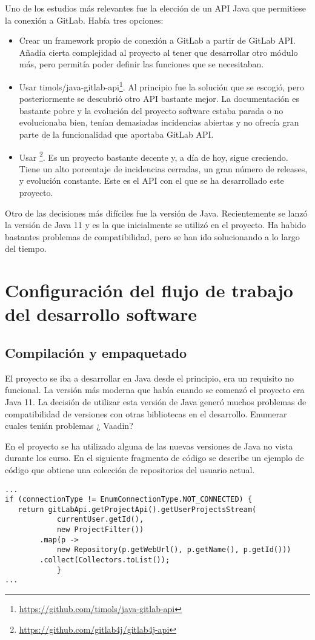 Uno de los estudios más relevantes fue la elección de un API Java que permitiese la conexión a GitLab. Había tres opciones:
\begin{itemize}
	\item Crear un framework propio de conexión a GitLab a partir de GitLab API. Añadía cierta complejidad al proyecto al tener que desarrollar otro módulo más, pero permitía poder definir las funciones que se necesitaban.
	\item Usar timols/java-gitlab-api\footnote{\url{https://github.com/timols/java-gitlab-api}}\cite{olshansky_wrapper_2019}. Al principio fue la solución que se escogió, pero posteriormente se descubrió otro API bastante mejor. La documentación es bastante pobre y la evolución del proyecto software estaba parada o no evolucionaba bien, tenían demasiadas incidencias abiertas y no ofrecía gran parte de la funcionalidad que aportaba GitLab API.
	\item  Usar \footnote{\url{https://github.com/gitlab4j/gitlab4j-api}}\cite{noauthor_gitlab4j_2019}. Es un proyecto bastante decente y, a día de hoy, sigue creciendo. Tiene un alto porcentaje de incidencias cerradas, un gran número de releases, y evolución constante. Este es el API con el que se ha desarrollado este proyecto.
\end{itemize}
Otro de las decisiones más difíciles fue la versión de Java. Recientemente se lanzó la versión de Java 11 y es la que inicialmente se utilizó en el proyecto. Ha habido bastantes problemas de compatibilidad, pero se han ido solucionando a lo largo del tiempo.
\section{Configuración del flujo de trabajo del desarrollo software}
\subsection{Compilación y empaquetado}

El proyecto se iba a desarrollar en Java desde el principio, era un requisito no funcional. La versión más moderna que había cuando se comenzó el proyecto era Java 11. La decisión de utilizar esta versión de Java generó muchos problemas de compatibilidad de versiones con  otras bibliotecas en el desarrollo. 
\todo Enumerar cuales tenián problemas ¿ Vaadin?

En el proyecto se ha utilizado alguna de las nuevas versiones de Java no vista durante los curso. En el siguiente fragmento de código se describe 
un ejemplo de código que obtiene una colección de repositorios del usuario actual.
\tiny{
\begin{lstlisting}
...
if (connectionType != EnumConnectionType.NOT_CONNECTED) {
   return gitLabApi.getProjectApi().getUserProjectsStream(
   			currentUser.getId(),
   			new ProjectFilter())
		.map(p -> 
			new Repository(p.getWebUrl(), p.getName(), p.getId()))
		.collect(Collectors.toList());
			}
...
\end{lstlisting}
}

